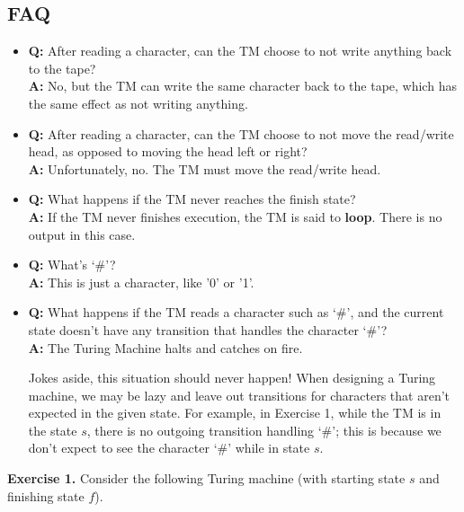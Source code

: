 \documentclass[10pt]{article}
\begin{document}
\subsection*{FAQ}
\begin{itemize}
	\item \textbf{Q:} After reading a character, can the TM choose to not write anything back to the tape?\\
	\textbf{A:} No, but the TM can write the same character back to the tape, which has the same effect as not writing anything.
	\item \textbf{Q:} After reading a character, can the TM choose to not move the read/write head, as opposed to moving the head left or right?\\
	\textbf{A:} Unfortunately, no. The TM must move the read/write head.
	\item \textbf{Q:} What happens if the TM never reaches the finish state?\\
	\textbf{A:} If the TM never finishes execution, the TM is said to \textbf{loop}. There is no output in this case.
	\item \textbf{Q:} What's `\#'?\\
	\textbf{A:} This is just a character, like '0' or '1'. 
	\item \textbf{Q:} What happens if the TM reads a character such as `\#', and the current state doesn't have any transition that handles the character `\#'? \\
	\textbf{A:} The Turing Machine halts and catches on fire.
	
	Jokes aside, this situation should never happen! When designing a Turing machine, we may be lazy and leave out transitions for characters that aren't expected in the given state. For example, in Exercise 1, while the TM is in the state $s$, there is no outgoing transition handling `\#'; this is because we don't expect to see the character `\#' while in state $s$.
\end{itemize}

\newpage

\textbf{Exercise 1.} Consider the following Turing machine (with starting state $s$ and finishing state $f$).
\end{document}

